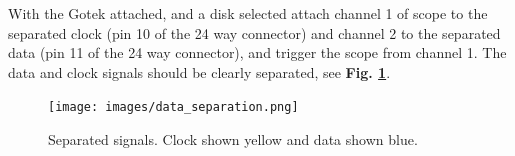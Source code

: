 With the Gotek attached, and a disk selected attach channel 1 of scope to the separated clock (pin 10 of the 24 way connector) and channel 2 to the separated data (pin 11 of the 24 way connector), and trigger the scope from channel 1. The data and clock signals should be clearly separated, see \textbf{Fig. \ref{fig:separation}}.

\begin{figure}[htbp]
\begin{center}
\texttt{[image: images/data\_separation.png]}
\caption{Separated signals. Clock shown yellow and data shown blue.}
\label{fig:separation}
\end{center}
\end{figure}




